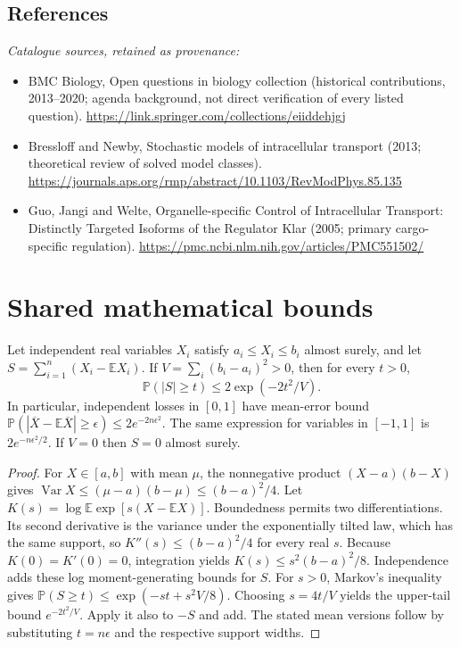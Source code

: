 \documentclass[11pt]{article}
\begin{document}
\subsection{References}
\noindent\emph{Catalogue sources, retained as provenance:}
\begin{itemize}
\item BMC Biology, Open questions in biology collection (historical contributions, 2013--2020; agenda background, not direct verification of every listed question). \url{https://link.springer.com/collections/eiiddehjgj}
\item Bressloff and Newby, Stochastic models of intracellular transport (2013; theoretical review of solved model classes). \url{https://journals.aps.org/rmp/abstract/10.1103/RevModPhys.85.135}
\item Guo, Jangi and Welte, Organelle-specific Control of Intracellular Transport: Distinctly Targeted Isoforms of the Regulator Klar (2005; primary cargo-specific regulation). \url{https://pmc.ncbi.nlm.nih.gov/articles/PMC551502/}
\end{itemize}




\section{Shared mathematical bounds}\label{app:bounds}
\begin{lemma}\label{lem:bounded}
Let independent real variables $X_i$ satisfy $a_i\leq X_i\leq b_i$ almost surely,
and let $S=\sum_{i=1}^n(X_i-\mathbb{E} X_i)$. If
$V=\sum_i(b_i-a_i)^2>0$, then for every $t>0$,
\[
 \mathbb{P}(|S|\geq t)\leq 2\exp(-2t^2/V).
\]
In particular, independent losses in $[0,1]$ have mean-error bound
$\mathbb{P}(|\overline X-\mathbb{E}\overline X|\geq\epsilon)
\leq2e^{-2n\epsilon^2}$. The same expression for variables in $[-1,1]$
is $2e^{-n\epsilon^2/2}$. If $V=0$ then $S=0$ almost surely.
\end{lemma}
\begin{proof}
For $X\in[a,b]$ with mean $\mu$, the nonnegative product
$(X-a)(b-X)$ gives
$\operatorname{Var} X\leq(\mu-a)(b-\mu)\leq(b-a)^2/4$.
Let $K(s)=\log\mathbb{E}\exp[s(X-\mathbb{E} X)]$.
Boundedness permits two differentiations. Its second derivative is the variance
under the exponentially tilted law, which has the same support, so
$K''(s)\leq(b-a)^2/4$ for every real $s$.
Because $K(0)=K'(0)=0$, integration yields
$K(s)\leq s^2(b-a)^2/8$.
Independence adds these log moment-generating bounds for $S$.
For $s>0$, Markov's inequality gives
$\mathbb{P}(S\geq t)\leq\exp(-st+s^2V/8)$.
Choosing $s=4t/V$ yields the upper-tail bound $e^{-2t^2/V}$.
Apply it also to $-S$ and add. The stated mean versions follow by substituting
$t=n\epsilon$ and the respective support widths.
\end{proof}
\end{document}
